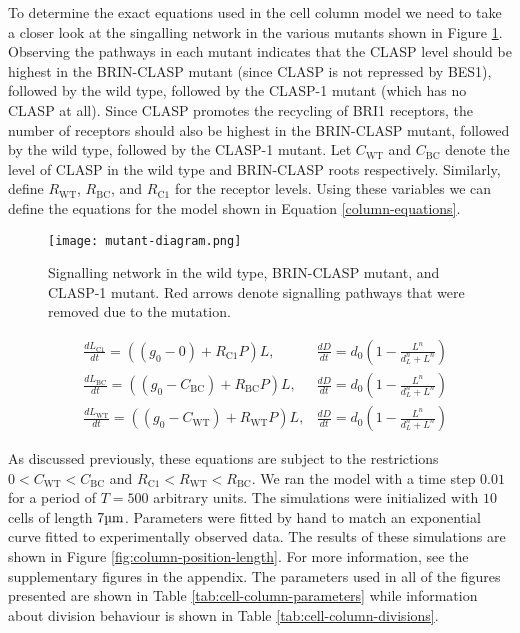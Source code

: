 To determine the exact equations used in the cell column model we need to take a closer look at the singalling network in the various mutants shown in Figure \ref{fig:mutant-diagram}. Observing the pathways in each mutant indicates that the CLASP level should be highest in the BRIN-CLASP mutant (since CLASP is not repressed by BES1), followed by the wild type, followed by the CLASP-1 mutant (which has no CLASP at all). Since CLASP promotes the recycling of BRI1 receptors, the number of receptors should also be highest in the BRIN-CLASP mutant, followed by the wild type, followed by the CLASP-1 mutant. Let $C_{\text{WT}}$ and $C_{\text{BC}}$ denote the level of CLASP in the wild type and BRIN-CLASP roots respectively. Similarly, define $R_{\text{WT}}$, $R_{\text{BC}}$, and $R_{\text{C1}}$ for the receptor levels. Using these variables we can define the equations for the model shown in Equation \eqref{column-equations}.

\begin{figure}
    \centering
    \texttt{[image: mutant-diagram.png]}
    \caption{Signalling network in the wild type, BRIN-CLASP mutant, and CLASP-1 mutant. Red arrows denote signalling pathways that were removed due to the mutation.} 
    \label{fig:mutant-diagram}
\end{figure}


\begin{equation}
\label{column-equations}
\begin{aligned}
    &\frac{dL_{\text{C1}}}{dt} = ((g_{0} - 0) + R_{\text{C1}}P)L, &\frac{dD}{dt} = d_{0}\left( 1 - \frac{L^{n}}{d_{L}^{n} + L^{n}} \right)  \\[5pt]
    &\frac{dL_{\text{BC}}}{dt} = ((g_{0} - C_{\text{BC}}) + R_{\text{BC}}P)L, &\frac{dD}{dt} = d_{0}\left( 1 - \frac{L^{n}}{d_{L}^{n} + L^{n}} \right)  \\[5pt]
    &\frac{dL_{\text{WT}}}{dt} = ((g_{0} - C_{\text{WT}}) + R_{\text{WT}}P)L,  &\frac{dD}{dt} = d_{0}\left( 1 - \frac{L^{n}}{d_{L}^{n} + L^{n}} \right)
\end{aligned}
\end{equation}


\medskip

As discussed previously, these equations are subject to the restrictions $0 < C_{\text{WT}} < C_{\text{BC}}$ and $R_{\text{C1}} < R_{\text{WT}} < R_{\text{BC}}$. We ran the model with a time step $0.01$ for a period of $T = 500$ arbitrary units. The simulations were initialized with $10$ cells of length $7\um$. Parameters were fitted by hand to match an exponential curve fitted to experimentally observed data. The results of these simulations are shown in Figure \ref{fig:column-position-length}. For more information, see the supplementary figures in the appendix. The parameters used in all of the figures presented are shown in Table \ref{tab:cell-column-parameters} while information about division behaviour is shown in Table \ref{tab:cell-column-divisions}.


